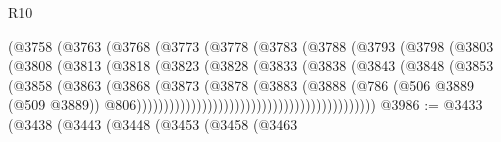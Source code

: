 \begin{lexlean}{R10}
\begin{coremodule}
                                    (@3758
                                      (@3763
                                        (@3768
                                          (@3773
                                            (@3778
                                              (@3783
                                                (@3788
                                                  (@3793
                                                    (@3798
                                                      (@3803
                                                        (@3808
                                                          (@3813
                                                            (@3818
                                                              (@3823
                                                                (@3828
                                                                  (@3833
                                                                    (@3838
                                                                      (@3843
                                                                        (@3848
                                                                          (@3853
                                                                            (@3858
                                                                              (@3863
                                                                                (@3868
                                                                                  (@3873
                                                                                    (@3878
                                                                                      (@3883
                                                                                        (@3888
                                                                                          (@786
                                                                                            (@506
                                                                                              @3889
                                                                                              (@509
                                                                                                @3889))
                                                                                            @806))))))))))))))))))))))))))))))))))))))))))))
@3986 := @3433
    (@3438
      (@3443
        (@3448
          (@3453
            (@3458
              (@3463

\end{coremodule}
\end{lexlean}
